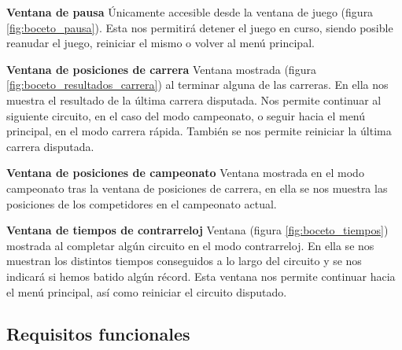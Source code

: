 \begin{description}
    
    \item \textbf{Ventana de pausa} Únicamente accesible desde la ventana de juego (figura \ref{fig:boceto_pausa}). Esta nos permitirá detener el juego en curso, 
    siendo posible reanudar el juego, reiniciar el mismo o volver al menú principal.

    
    \item \textbf{Ventana de posiciones de carrera} Ventana mostrada (figura \ref{fig:boceto_resultados_carrera}) al terminar alguna de las carreras. En ella nos muestra el 
    resultado de la última carrera disputada. Nos permite continuar al siguiente circuito, en el caso del modo campeonato, o seguir
    hacia el menú principal, en el modo carrera rápida. También se nos permite
    reiniciar la última carrera disputada.

        
    \item \textbf{Ventana de posiciones de campeonato} Ventana mostrada en el modo campeonato tras la ventana de posiciones 
    de carrera, en ella se nos muestra las posiciones de los competidores en el campeonato actual.
    
    \item \textbf{Ventana de tiempos de contrarreloj} Ventana (figura \ref{fig:boceto_tiempos}) mostrada al completar algún circuito en el modo contrarreloj. En ella
    se nos muestran los distintos tiempos conseguidos a lo largo del circuito y
    se nos indicará si hemos batido algún récord.
    Esta ventana nos permite continuar hacia el menú principal, así como reiniciar el circuito disputado.

    
\end{description}

\subsection{Requisitos funcionales}


